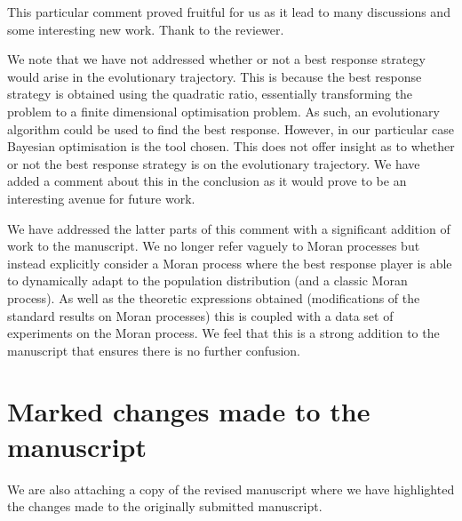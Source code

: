 \documentclass{article}
\begin{document}
This particular comment proved fruitful for us as it lead to many
discussions and some interesting new work. Thank to the reviewer.

We note that we have not addressed whether or not a best response strategy would
arise in the evolutionary trajectory. This is because the best response strategy
is obtained using the quadratic ratio, essentially transforming the
problem to a finite dimensional optimisation problem. As such, an evolutionary
algorithm could be used to find the best response. However, in our particular case
Bayesian optimisation is the tool chosen. This does not offer insight as to
whether or not the best response strategy is on the evolutionary trajectory.
We have added a comment about this in the conclusion as it would prove to be an
interesting avenue for future work.

We have addressed the latter parts of this comment with a significant addition
of work to the manuscript. We no longer refer vaguely to Moran processes but
instead explicitly consider a Moran process where the best response player is
able to dynamically adapt to the population distribution (and a classic Moran
process). As well as the theoretic expressions obtained (modifications of the
standard results on Moran processes) this is coupled with a data set of
experiments on the Moran process. We feel that this is a strong addition to the
manuscript that ensures there is no further confusion.

\section{Marked changes made to the manuscript}

We are also attaching a copy of the revised manuscript where we have highlighted
the changes made to the originally submitted manuscript.


\end{document}
